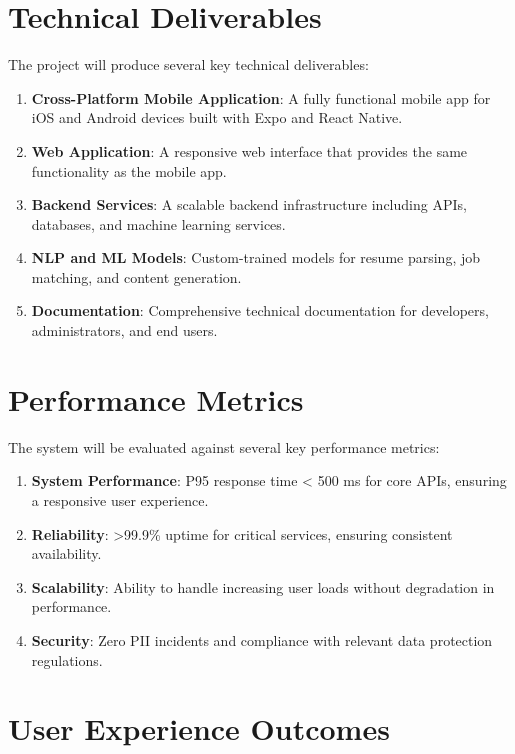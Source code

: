 \documentclass[12pt,a4paper]{report}
\begin{document}
\section*{Technical Deliverables}

The project will produce several key technical deliverables:

\begin{enumerate}
    \item \textbf{Cross-Platform Mobile Application}: A fully functional mobile app for iOS and Android devices built with Expo and React Native.
    \item \textbf{Web Application}: A responsive web interface that provides the same functionality as the mobile app.
    \item \textbf{Backend Services}: A scalable backend infrastructure including APIs, databases, and machine learning services.
    \item \textbf{NLP and ML Models}: Custom-trained models for resume parsing, job matching, and content generation.
    \item \textbf{Documentation}: Comprehensive technical documentation for developers, administrators, and end users.
\end{enumerate}

\section*{Performance Metrics}

The system will be evaluated against several key performance metrics:

\begin{enumerate}
    \item \textbf{System Performance}: P95 response time < 500 ms for core APIs, ensuring a responsive user experience.
    \item \textbf{Reliability}: >99.9\% uptime for critical services, ensuring consistent availability.
    \item \textbf{Scalability}: Ability to handle increasing user loads without degradation in performance.
    \item \textbf{Security}: Zero PII incidents and compliance with relevant data protection regulations.
\end{enumerate}

\section*{User Experience Outcomes}
\end{document}

